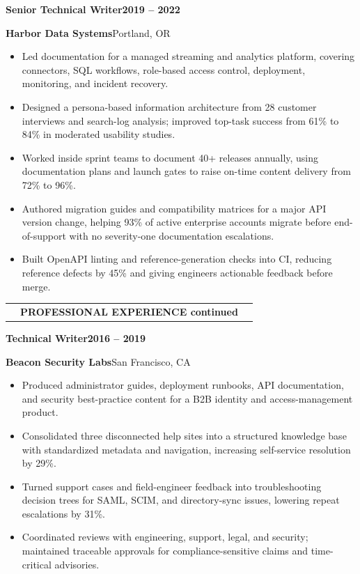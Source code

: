\documentclass[10pt,letterpaper]{article}
\makeatletter
\newcommand{\resumesection}[2]{%
  \Needspace*{5\baselineskip}%
  \vspace{7pt}%
  \begin{tabularx}{\linewidth}{@{}>{\raggedright\arraybackslash}p{0.23in}@{\hspace{6pt}}>{\raggedright\arraybackslash}l@{\hspace{9pt}}X@{}}
    {\small\bfseries\color{teal}#1} &
    {\large\bfseries\color{navy}#2} &
    \raisebox{0.55ex}{\color{rulegray}\leaders\hrule height 0.7pt\hfill\kern0pt}
  \end{tabularx}%
  \par\vspace{3pt}%
}
\newcommand{\role}[4]{%
  \Needspace*{8\baselineskip}%
  \vspace{3pt}%
  {\large\bfseries\color{navy}#1}\hfill{\small\bfseries\color{ink}#2}\par
  {\bfseries\color{teal}#3}\hfill{\small\color{muted}#4}\par
}
\makeatother
\begin{document}
\role{Senior Technical Writer}{2019 -- 2022}{Harbor Data Systems}{Portland, OR}
\begin{itemize}
  \item Led documentation for a managed streaming and analytics platform, covering connectors, SQL workflows, role-based access control, deployment, monitoring, and incident recovery.
  \item Designed a persona-based information architecture from 28 customer interviews and search-log analysis; improved top-task success from 61\% to 84\% in moderated usability studies.
  \item Worked inside sprint teams to document 40+ releases annually, using documentation plans and launch gates to raise on-time content delivery from 72\% to 96\%.
  \item Authored migration guides and compatibility matrices for a major API version change, helping 93\% of active enterprise accounts migrate before end-of-support with no severity-one documentation escalations.
  \item Built OpenAPI linting and reference-generation checks into CI, reducing reference defects by 45\% and giving engineers actionable feedback before merge.
\end{itemize}

\newpage

\resumesection{03}{PROFESSIONAL EXPERIENCE \textnormal{\small\color{muted}continued}}

\role{Technical Writer}{2016 -- 2019}{Beacon Security Labs}{San Francisco, CA}
\begin{itemize}
  \item Produced administrator guides, deployment runbooks, API documentation, and security best-practice content for a B2B identity and access-management product.
  \item Consolidated three disconnected help sites into a structured knowledge base with standardized metadata and navigation, increasing self-service resolution by 29\%.
  \item Turned support cases and field-engineer feedback into troubleshooting decision trees for SAML, SCIM, and directory-sync issues, lowering repeat escalations by 31\%.
  \item Coordinated reviews with engineering, support, legal, and security; maintained traceable approvals for compliance-sensitive claims and time-critical advisories.
\end{itemize}
\end{document}
